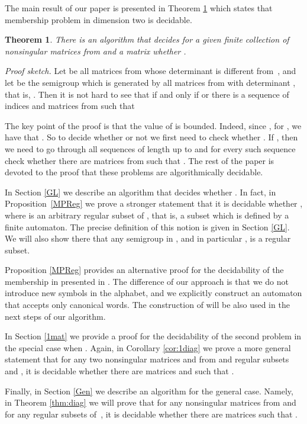 \documentclass[fontsize=11pt,DIV=13,paper=letter]{scrartcl}
\newtheorem{theorem}{Theorem}\newtheorem{proposition}[theorem]{Proposition}
\theoremstyle{definition}
\begin{document}
The main result of our paper is presented in Theorem \ref{thm:mem} which states that membership problem in dimension two is decidable.

\begin{theorem} \label{thm:mem}
There is an algorithm that decides for a given finite collection  of nonsingular matrices from  and a matrix  whether .
\end{theorem}

{\it Proof sketch.} Let  be all matrices from  whose determinant is different from~, and let  be the semigroup which is generated by all matrices from  with determinant , that is, . Then it is not hard to see that  if and only if  or there is a sequence of indices  and matrices  from  such that


The key point of the proof is that the value of  is bounded. Indeed, since , for , we have that . So to decide whether or not  we first need to check whether . If , then we need to go through all sequences  of length up to  and for every such sequence check whether there are matrices  from  such that . The rest of the paper is devoted to the proof that these problems are algorithmically decidable.

In Section \ref{GL} we describe an algorithm that decides whether . In fact, in Proposition~\ref{MPReg} we prove a stronger statement that it is decidable whether , where  is an arbitrary regular subset of , that is, a subset which is defined by a finite automaton. The precise definition of this notion is given in Section \ref{GL}. We will also show there that any semigroup in , and in particular , is a regular subset.

Proposition \ref{MPReg} provides an alternative proof for the decidability of the membership in  presented in \cite{CK2005}. The difference of our approach is that we do not introduce new symbols in the alphabet, and we explicitly construct an automaton  that accepts only canonical words. The construction of  will be also used in the next steps of our algorithm.

In Section \ref{1mat} we provide a proof for the decidability of the second problem in the special case when . Again, in Corollary \ref{cor:1diag} we prove a more general statement that for any two nonsingular matrices  and  from  and regular subsets  and , it is decidable whether there are matrices  and  such that .

Finally, in Section \ref{Gen} we describe an algorithm for the general case. Namely, in Theorem \ref{thm:diag} we will prove that for any nonsingular matrices  from  and for any regular subsets  of~, it is decidable whether there are matrices  such that .
\end{document}
